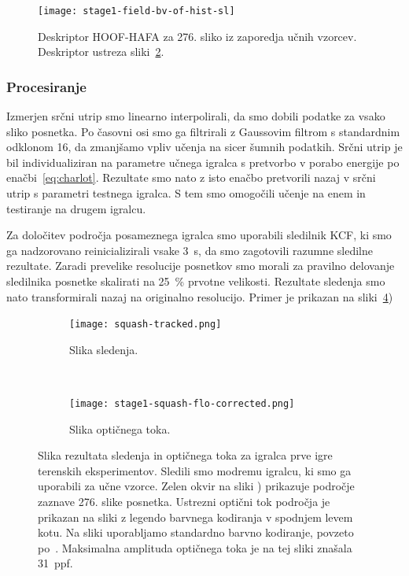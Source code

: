 \begin{figure}[!htb]
	\centering
	\texttt{[image: stage1-field-bv-of-hist-sl]}
	\caption[Deskriptor HOOF-HAFA za 276. sliko sliko iz zaporedja učnih vzorcev]{Deskriptor HOOF-HAFA za 276. sliko iz zaporedja učnih vzorcev. Deskriptor ustreza sliki~\ref{fig:sledenje-squash}.}
	\label{fig:hoof-hafa}
\end{figure}

\subsubsection{Procesiranje}
Izmerjen srčni utrip smo linearno interpolirali, da smo dobili podatke za vsako sliko posnetka. Po časovni osi smo ga filtrirali z Gaussovim filtrom s standardnim odklonom \num{16}, da zmanjšamo vpliv učenja na sicer šumnih podatkih. Srčni utrip je bil individualiziran na parametre učnega igralca s pretvorbo v porabo energije po enačbi~\eqref{eq:charlot}. Rezultate smo nato z isto enačbo pretvorili nazaj v srčni utrip s parametri testnega igralca. S tem smo omogočili učenje na enem in testiranje na drugem igralcu. 

Za določitev področja posameznega igralca smo uporabili sledilnik KCF, ki smo ga nadzorovano reinicializirali vsake \SI{3}{\s}, da smo zagotovili razumne sledilne rezultate. Zaradi prevelike resolucije posnetkov smo morali za pravilno delovanje sledilnika posnetke skalirati na \SI{25}{\%} prvotne velikosti. Rezultate sledenja smo nato transformirali nazaj na originalno resolucijo. Primer je prikazan na sliki~\ref{fig:squash})

\begin{figure}[!htb]
	\centering
	\begin{subfigure}[t]{0.45\columnwidth}
		\centering
		\texttt{[image: squash-tracked.png]}
		\caption{Slika sledenja.}
	    \label{fig:sledenje-squash}
	\end{subfigure}
	~
	\begin{subfigure}[t]{0.45\columnwidth}
		\centering
		\texttt{[image: stage1-squash-flo-corrected.png]}
		\caption{Slika optičnega toka.}
		\label{fig:of-squash}
	\end{subfigure}
	\caption[Slika sledenja in optičnega toka za igralca terenskih eksperimentov]{Slika rezultata sledenja in optičnega toka za igralca prve igre terenskih eksperimentov. Sledili smo modremu igralcu, ki smo ga uporabili za učne vzorce. Zelen okvir na sliki ) prikazuje področje zaznave 276. slike posnetka. Ustrezni optični tok področja je prikazan na sliki  z legendo barvnega kodiranja v spodnjem levem kotu. Na sliki uporabljamo standardno barvno kodiranje, povzeto po~\cite{baker2011database}. Maksimalna amplituda optičnega toka je na tej sliki znašala \SI{31}{ppf}. }
	\label{fig:squash}
\end{figure}

